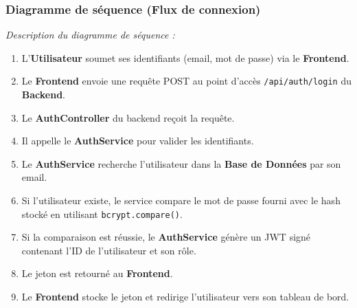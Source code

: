 \documentclass{report}
\begin{document}
\subsubsection{\color{SoftEspresso}Diagramme de séquence (Flux de connexion)}
\textit{Description du diagramme de séquence :}
\begin{enumerate}
    \item L'\textbf{\color{SoftEspresso}Utilisateur} soumet ses identifiants (email, mot de passe) via le \textbf{\color{SoftEspresso}Frontend}.
    \item Le \textbf{\color{SoftEspresso}Frontend} envoie une requête POST au point d'accès \texttt{/api/auth/login} du \textbf{\color{SoftEspresso}Backend}.
    \item Le \textbf{\color{SoftEspresso}AuthController} du backend reçoit la requête.
    \item Il appelle le \textbf{\color{SoftEspresso}AuthService} pour valider les identifiants.
    \item Le \textbf{\color{SoftEspresso}AuthService} recherche l'utilisateur dans la \textbf{\color{SoftEspresso}Base de Données} par son email.
    \item Si l'utilisateur existe, le service compare le mot de passe fourni avec le hash stocké en utilisant \texttt{bcrypt.compare()}.
    \item Si la comparaison est réussie, le \textbf{\color{SoftEspresso}AuthService} génère un JWT signé contenant l'ID de l'utilisateur et son rôle.
    \item Le jeton est retourné au \textbf{\color{SoftEspresso}Frontend}.
    \item Le \textbf{\color{SoftEspresso}Frontend} stocke le jeton et redirige l'utilisateur vers son tableau de bord.
\end{enumerate}
\end{document}
